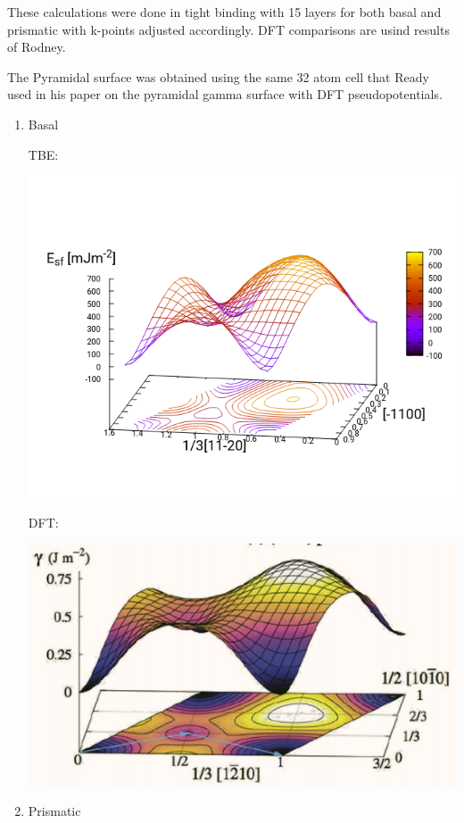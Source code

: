 \documentclass[11pt]{article}
\begin{document}
\begin{enumerate}
These calculations were done in tight binding with 15 layers for both
basal and prismatic with k-points adjusted accordingly. 
DFT comparisons are usind results of Rodney. 

The Pyramidal surface was obtained using the same 32 atom cell that
Ready used in his paper on the pyramidal gamma surface with DFT
pseudopotentials. 

\newpage
\begin{enumerate}
\item Basal
\label{sec:org09d3fb3}

TBE:
\begin{center}
\includegraphics[width=.9\linewidth]{Images/basal_gs_noo_2019-11-08_alat.png}
\end{center}

DFT:
\begin{center}
\includegraphics[width=.9\linewidth]{Images/rodney_basal_ti_gamma_surface.png}
\end{center}

\item Prismatic
\label{sec:org76a47f2}


\end{enumerate}
\end{enumerate}
\end{document}
